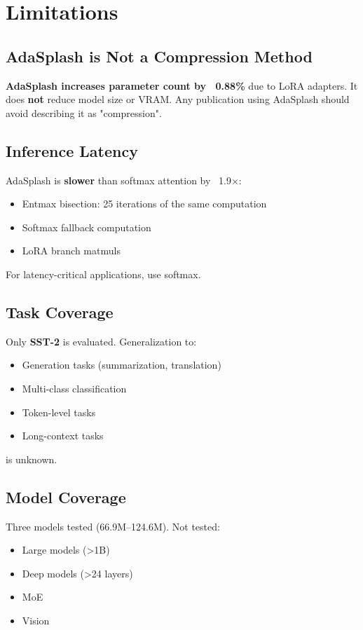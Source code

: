 
\section{Limitations}

\subsection{AdaSplash is Not a Compression Method}

\textbf{AdaSplash increases parameter count by ~0.88\%} due to LoRA 
adapters. It does \textbf{not} reduce model size or VRAM. Any publication using 
AdaSplash should avoid describing it as "compression".

\subsection{Inference Latency}

AdaSplash is \textbf{slower} than softmax attention by ~1.9$\times$:

\begin{itemize}
\item Entmax bisection: 25 iterations of the same computation
\item Softmax fallback computation
\item LoRA branch matmuls

\end{itemize}
For latency-critical applications, use softmax.

\subsection{Task Coverage}

Only \textbf{SST-2} is evaluated. Generalization to:
\begin{itemize}
\item Generation tasks (summarization, translation)
\item Multi-class classification
\item Token-level tasks
\item Long-context tasks

\end{itemize}
is unknown.

\subsection{Model Coverage}

Three models tested (66.9M--124.6M). Not tested:
\begin{itemize}
\item Large models (\textgreater{}1B)
\item Deep models (\textgreater{}24 layers)
\item MoE
\item Vision

\end{itemize}
